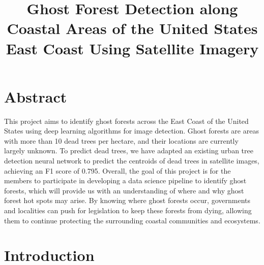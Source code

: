 \documentclass[conference]{ieeetran}
\begin{document}
\title{Ghost Forest Detection along Coastal Areas of the United States East Coast Using Satellite Imagery}



\author{}

\maketitle


\section{Abstract}

This project aims to identify ghost forests across the East Coast of the United States using deep learning algorithms for image detection. Ghost forests are areas with more than 10 dead trees per hectare, and their locations are currently largely unknown. To predict dead trees, we have adapted an existing urban tree detection neural network \cite{ventura2024individual} to predict the centroids of dead trees in satellite images, achieving an F1 score of 0.795. Overall, the goal of this project is for the members to participate in developing a data science pipeline to identify ghost forests, which will provide us with an understanding of where and why ghost forest hot spots may arise. By knowing where ghost forests occur, governments and localities can push for legislation to keep these forests from dying, allowing them to continue protecting the surrounding coastal communities and ecosystems. 
 
\section{Introduction}
\end{document}
